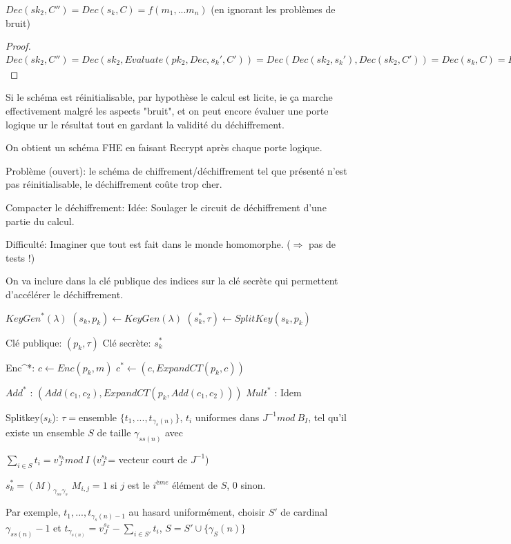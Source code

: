 \begin{prop}
$Dec(sk_2,C'')=Dec(s_k,C)=f(m_1,...m_n)$ (en ignorant les problèmes de bruit)
\end{prop}

\begin{proof}
$Dec(sk_2,C'')=Dec(sk_2,Evaluate(pk_2,Dec,s_k',C'))=Dec(Dec(sk_2,s_k'),Dec(sk_2,C'))=Dec(s_k,C)=Dec(s_k,Evaluate(p_k,f,c_1,...,c_n))=f(m_1,...,m_n)$
\end{proof}

Si le schéma est réinitialisable, par hypothèse le calcul est licite, ie ça marche effectivement malgré les aspects "bruit", et on peut encore évaluer une porte logique ur le résultat tout en gardant la validité du déchiffrement.

On obtient un schéma FHE en faisant Recrypt après chaque porte logique.

Problème (ouvert): le schéma de chiffrement/déchiffrement tel que présenté n'est pas réinitialisable, le déchiffrement coûte trop cher.

Compacter le déchiffrement: Idée: Soulager le circuit de déchiffrement d'une partie du calcul.

Difficulté: Imaginer que tout est fait dans le monde homomorphe. ($\Rightarrow$ pas de tests !)

On va inclure dans la clé publique des indices sur la clé secrète qui permettent d'accélérer le déchiffrement.

$KeyGen^*(\lambda)$
$(s_k,p_k) \leftarrow KeyGen(\lambda)$
$(s_k^*,\tau) \leftarrow SplitKey(s_k,p_k)$

Clé publique: $(p_k,\tau)$
Clé secrète: $s_k^*$

Enc^*: $c \leftarrow Enc(p_k,m)$
$c^* \leftarrow (c,Expand CT(p_k,c))$

$Add^*$ : $(Add(c_1,c_2),Expand CT(p_k, Add(c_1,c_2)))$
$Mult^*$ : Idem

Splitkey($s_k$):
$\tau=$ensemble $\{ t_1,...,t_{\gamma_s(n)} \}$, $t_i$ uniformes dans $J^{-1} mod \ B_I$, tel qu'il existe un ensemble $S$ de taille $\gamma_{ss(n)}$ avec

$\sum_{i \in S} t_i= v_J^{s_k} mod \ I$ ($v_J^{s_k}$= vecteur court de $J^{-1}$)

$s_k^*=(M)_{\gamma_{ss} \gamma_s}$ $M_{i,j}=1$ si $j$ est le $i^{ème}$ élément de $S$, $0$ sinon. 

Par exemple, $t_1,...,t_{\gamma_s(n)-1}$ au hasard uniformément, choisir $S'$ de cardinal $\gamma_{ss(n)}-1$ et
$t_{\gamma_{s(n)}}=v_J^{s_k} - \sum_{i \in S'} t_i$, $S=S' \cup \{ \gamma_S(n) \}$

